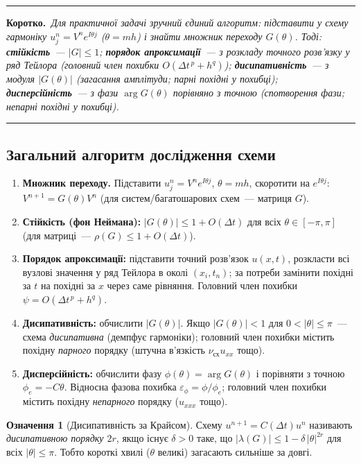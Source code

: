 \documentclass[12pt,a4paper]{article}
\theoremstyle{definition}
\newtheorem{ozn}{Означення}[section]
\theoremstyle{plain}
\newenvironment{korotko}
  {\par\medskip\noindent\begingroup\color{accent!75!black}\rule{\linewidth}{0.4pt}\par
   \noindent\textbf{Коротко.}\itshape\,}
  {\par\noindent\rule{\linewidth}{0.4pt}\endgroup\medskip}
\newcommand{\abs}[1]{\left\lvert #1 \right\rvert}
\begin{document}
\begin{korotko}
Для практичної задачі зручний єдиний алгоритм: підставити у схему
гармоніку $u_j^n=V^n e^{I\theta j}$ ($\theta=mh$) і знайти множник
переходу $G(\theta)$. Тоді: \;\textbf{стійкість}~--- $\abs{G}\le1$;
\;\textbf{порядок апроксимації}~--- з розкладу точного розв'язку у ряд
Тейлора (головний член похибки $O(\Delta t^{\,p}+h^{q})$);
\;\textbf{дисипативність}~--- з модуля $\abs{G(\theta)}$ (загасання
амплітуди; \emph{парні} похідні у похибці);
\;\textbf{дисперсійність}~--- з фази $\arg G(\theta)$ порівняно з точною
(спотворення фази; \emph{непарні} похідні у похибці).
\end{korotko}

\subsection{Загальний алгоритм дослідження схеми}
\begin{enumerate}[leftmargin=1.8em]
  \item \textbf{Множник переходу.} Підставити $u_j^n=V^n e^{I\theta j}$,
  $\theta=mh$, скоротити на $e^{I\theta j}$:\; $V^{n+1}=G(\theta)V^n$
  (для систем/багатошарових схем~--- матриця $G$).
  \item \textbf{Стійкість (фон Неймана):} $\abs{G(\theta)}\le1+O(\Delta t)$
  для всіх $\theta\in[-\pi,\pi]$ (для матриці~--- $\rho(G)\le1+O(\Delta t)$).
  \item \textbf{Порядок апроксимації:} підставити точний розв'язок
  $u(x,t)$, розкласти всі вузлові значення у ряд Тейлора в околі
  $(x_i,t_n)$; за потреби замінити похідні за $t$ на похідні за $x$ через
  саме рівняння. Головний член похибки $\psi=O(\Delta t^{\,p}+h^{q})$.
  \item \textbf{Дисипативність:} обчислити $\abs{G(\theta)}$. Якщо
  $\abs{G(\theta)}<1$ для $0<\abs{\theta}\le\pi$~--- схема \emph{дисипативна}
  (демпфує гармоніки); головний член похибки містить похідну
  \emph{парного} порядку (штучна в'язкість $\nu_{\text{сх}}u_{xx}$ тощо).
  \item \textbf{Дисперсійність:} обчислити фазу $\phi(\theta)=\arg G(\theta)$
  і порівняти з точною $\phi_e=-C\theta$. Відносна фазова похибка
  $\varepsilon_\phi=\phi/\phi_e$; головний член похибки містить похідну
  \emph{непарного} порядку ($u_{xxx}$ тощо).
\end{enumerate}

\begin{ozn}[Дисипативність за Крайсом]
Схему $u^{n+1}=C(\Delta t)u^n$ називають \emph{дисипативною порядку $2r$},
якщо існує $\delta>0$ таке, що
$\abs{\lambda(G)}\le1-\delta\,\abs{\theta}^{2r}$ для всіх
$\abs{\theta}\le\pi$. Тобто короткі хвилі ($\theta$ великі) загасають
сильніше за довгі.
\end{ozn}
\end{document}
